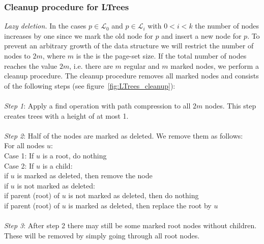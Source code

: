 \documentclass[a4paper,12pt, titlepage]{article}  %
\newcommand{\cl}{\mathcal{L}}   %
\begin{document}
\subsubsection{Cleanup procedure for LTrees}
\noindent \emph{Lazy deletion.} In the cases $p \in \cl_0$ and $p \in \cl_i$ with $0<i<k$ the number 
of nodes increases by one since we mark the old node for $p$ and insert a new node for $p$. To prevent
an arbitrary growth of the data structure we will restrict the number of nodes to $2m$, where $m$ is the 
is the page-set size. If the total number of nodes reaches the value $2m$, i.e. there are $m$ regular and $m$ marked
nodes, we perform a cleanup procedure. The cleanup procedure removes all marked nodes and consists of the following steps (see figure~\ref{fig:LTrees_cleanup}):\\
\\
\textit{Step 1}: 
Apply a find operation with path compression to all $2m$ nodes. This step creates trees with a height of at most 1.\\
\\
\textit{Step 2}:
Half of the nodes are marked as deleted. We remove them as follows:\\
For all nodes $u$: \\
Case 1: If $u$ is a root, do nothing \\
Case 2: If $u$ is a child: \\
\hspace*{.5cm} if $u$ is marked as deleted, then remove the node \\
\hspace*{.5cm} if $u$ is not marked as deleted: \\
                  \hspace*{1cm} if parent (root) of $u$ is not marked as deleted, then do nothing \\
                  \hspace*{1cm} if parent (root) of $u$ is marked as deleted, then replace the root by $u$ \\
\\
\textit{Step 3}: After step 2 there may still be some marked root nodes without children. 
These will be removed by simply going through all root nodes.\\
\end{document}
